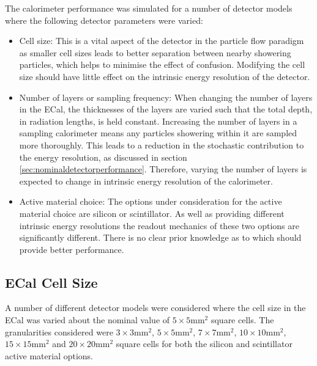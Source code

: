 The calorimeter performance was simulated for a number of detector models where the following detector parameters were varied:
\begin{itemize}
\item Cell size:  This is a vital aspect of the detector in the particle flow paradigm as smaller cell sizes leads to better separation between nearby showering particles, which helps to minimise the effect of confusion.  Modifying the cell size should have little effect on the intrinsic energy resolution of the detector.  
\item Number of layers or sampling frequency:  When changing the number of layers in the ECal, the thicknesses of the layers are varied such that the total depth, in radiation lengths, is held constant.  Increasing the number of layers in a sampling calorimeter means any particles showering within it are sampled more thoroughly.  This leads to a reduction in the stochastic contribution to the energy resolution, as discussed in section \ref{sec:nominaldetectorperformance}.  Therefore, varying the number of layers is expected to change in intrinsic energy resolution of the calorimeter.  
\item Active material choice:  The options under consideration for the active material choice are silicon or scintillator.  As well as providing different intrinsic energy resolutions the readout mechanics of these two options are significantly different.  There is no clear prior knowledge as to which should provide better performance. 
\end{itemize}


\subsection{ECal Cell Size}
\label{sec:ecalcells}
A number of different detector models were considered where the cell size in the ECal was varied about the nominal value of $5 \times 5 \text{mm}^{2}$ square cells.  The granularities considered were $3 \times 3 \text{mm}^{2}$, $5 \times 5 \text{mm}^{2}$, $7 \times 7 \text{mm}^{2}$, $10 \times 10 \text{mm}^{2}$, $15 \times 15 \text{mm}^{2}$ and $20 \times 20 \text{mm}^{2}$ square cells for both the silicon and scintillator active material options.  

